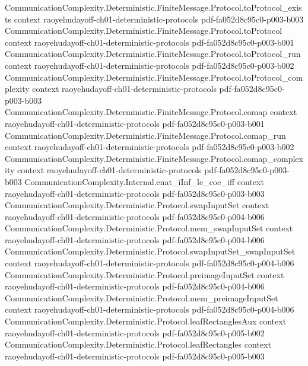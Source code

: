 \begin{lemma}
\proofstep
  {CommunicationComplexity.Deterministic.FiniteMessage.Protocol.toProtocol_exists}
  {context}
  {raoyehudayoff-ch01-deterministic-protocols}
  {pdf-fa052d8c95c0-p003-b003}
\proofstep
  {CommunicationComplexity.Deterministic.FiniteMessage.Protocol.toProtocol}
  {context}
  {raoyehudayoff-ch01-deterministic-protocols}
  {pdf-fa052d8c95c0-p003-b001}
\proofstep
  {CommunicationComplexity.Deterministic.FiniteMessage.Protocol.toProtocol_run}
  {context}
  {raoyehudayoff-ch01-deterministic-protocols}
  {pdf-fa052d8c95c0-p003-b002}
\proofstep
  {CommunicationComplexity.Deterministic.FiniteMessage.Protocol.toProtocol_complexity}
  {context}
  {raoyehudayoff-ch01-deterministic-protocols}
  {pdf-fa052d8c95c0-p003-b003}
\proofstep
  {CommunicationComplexity.Deterministic.FiniteMessage.Protocol.comap}
  {context}
  {raoyehudayoff-ch01-deterministic-protocols}
  {pdf-fa052d8c95c0-p003-b001}
\proofstep
  {CommunicationComplexity.Deterministic.FiniteMessage.Protocol.comap_run}
  {context}
  {raoyehudayoff-ch01-deterministic-protocols}
  {pdf-fa052d8c95c0-p003-b002}
\proofstep
  {CommunicationComplexity.Deterministic.FiniteMessage.Protocol.comap_complexity}
  {context}
  {raoyehudayoff-ch01-deterministic-protocols}
  {pdf-fa052d8c95c0-p003-b003}
\proofstep
  {CommunicationComplexity.Internal.enat_iInf_le_coe_iff}
  {context}
  {raoyehudayoff-ch01-deterministic-protocols}
  {pdf-fa052d8c95c0-p003-b003}
\proofstep
  {CommunicationComplexity.Deterministic.Protocol.swapInputSet}
  {context}
  {raoyehudayoff-ch01-deterministic-protocols}
  {pdf-fa052d8c95c0-p004-b006}
\proofstep
  {CommunicationComplexity.Deterministic.Protocol.mem_swapInputSet}
  {context}
  {raoyehudayoff-ch01-deterministic-protocols}
  {pdf-fa052d8c95c0-p004-b006}
\proofstep
  {CommunicationComplexity.Deterministic.Protocol.swapInputSet_swapInputSet}
  {context}
  {raoyehudayoff-ch01-deterministic-protocols}
  {pdf-fa052d8c95c0-p004-b006}
\proofstep
  {CommunicationComplexity.Deterministic.Protocol.preimageInputSet}
  {context}
  {raoyehudayoff-ch01-deterministic-protocols}
  {pdf-fa052d8c95c0-p004-b006}
\proofstep
  {CommunicationComplexity.Deterministic.Protocol.mem_preimageInputSet}
  {context}
  {raoyehudayoff-ch01-deterministic-protocols}
  {pdf-fa052d8c95c0-p004-b006}
\proofstep
  {CommunicationComplexity.Deterministic.Protocol.leafRectanglesAux}
  {context}
  {raoyehudayoff-ch01-deterministic-protocols}
  {pdf-fa052d8c95c0-p005-b002}
\proofstep
  {CommunicationComplexity.Deterministic.Protocol.leafRectangles}
  {context}
  {raoyehudayoff-ch01-deterministic-protocols}
  {pdf-fa052d8c95c0-p005-b003}

\end{lemma}
